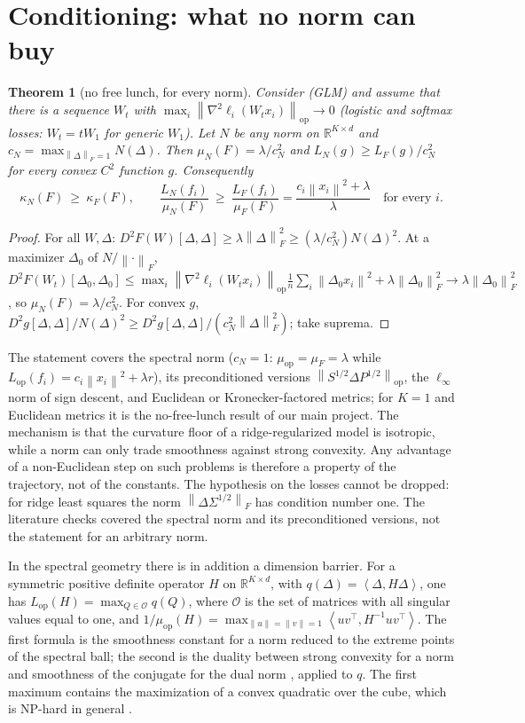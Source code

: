 \documentclass[11pt]{article}
\newtheorem{theorem}{Theorem}
\theoremstyle{remark}
\newcommand{\R}{\mathbb{R}}
\newcommand{\norm}[1]{\left\|#1\right\|}
\newcommand{\nop}[1]{\left\|#1\right\|_{\mathrm{op}}}
\newcommand{\nF}[1]{\left\|#1\right\|_{F}}
\newcommand{\inner}[2]{\left\langle #1, #2 \right\rangle}
\newcommand{\Lop}{L_{\mathrm{op}}}
\newcommand{\muop}{\mu_{\mathrm{op}}}
\newcommand{\kF}{\kappa_{F}}
\newcommand{\cO}{\mathcal{O}}
\begin{document}
\section{Conditioning: what no norm can buy}\label{sec:kappa}

\begin{theorem}[no free lunch, for every norm]\label{thm:nfl}
Consider (GLM) and assume that there is a sequence $W_t$ with $\max_i\nop{\nabla^2\ell_i(W_tx_i)}\to0$ (logistic and
softmax losses: $W_t=tW_1$ for generic $W_1$). Let $N$ be any norm on $\R^{K\times d}$ and $c_N=\max_{\nF\Delta=1}N(\Delta)$.
Then $\mu_N(F)=\lambda/c_N^2$ and $L_N(g)\ge L_F(g)/c_N^2$ for every convex $C^2$ function $g$. Consequently
\[
\kappa_N(F)\ \ge\ \kF(F),\qquad \frac{L_N(f_i)}{\mu_N(F)}\ \ge\ \frac{L_F(f_i)}{\mu_F(F)}=\frac{c_i\norm{x_i}^2+\lambda}{\lambda}\quad\text{for every }i .
\]
\end{theorem}
\begin{proof}
For all $W,\Delta$: $D^2F(W)[\Delta,\Delta]\ge\lambda\nF\Delta^2\ge(\lambda/c_N^2)N(\Delta)^2$. At a maximizer $\Delta_0$
of $N/\nF\cdot$, $D^2F(W_t)[\Delta_0,\Delta_0]\le\max_i\nop{\nabla^2\ell_i(W_tx_i)}\frac1n\sum_i\norm{\Delta_0x_i}^2+\lambda\nF{\Delta_0}^2
\to\lambda\nF{\Delta_0}^2$, so $\mu_N(F)=\lambda/c_N^2$. For convex $g$,
$D^2g[\Delta,\Delta]/N(\Delta)^2\ge D^2g[\Delta,\Delta]/(c_N^2\nF\Delta^2)$; take suprema.
\end{proof}

The statement covers the spectral norm ($c_N=1$: $\muop=\mu_F=\lambda$ while $\Lop(f_i)=c_i\norm{x_i}^2+\lambda r$), its
preconditioned versions $\nop{S^{1/2}\Delta P^{1/2}}$, the $\ell_\infty$ norm of sign descent, and Euclidean or
Kronecker-factored metrics; for $K=1$ and Euclidean metrics it is the no-free-lunch result of our main project. The
mechanism is that the curvature floor of a ridge-regularized model is isotropic, while a norm can only trade smoothness
against strong convexity. Any advantage of a non-Euclidean step on such problems is therefore a property of the
trajectory, not of the constants. The hypothesis on the losses cannot be dropped: for ridge least squares the norm
$\nF{\Delta\Sigma^{1/2}}$ has condition number one. The literature checks covered the spectral norm and its
preconditioned versions, not the statement for an arbitrary norm.

In the spectral geometry there is in addition a dimension barrier. For a symmetric positive definite operator $H$ on
$\R^{K\times d}$, with $q(\Delta)=\inner\Delta{H\Delta}$, one has $\Lop(H)=\max_{Q\in\cO}q(Q)$, where $\cO$ is the set of
matrices with all singular values equal to one, and $1/\muop(H)=\max_{\norm u=\norm v=1}\inner{uv^\top}{H^{-1}uv^\top}$.
The first formula is the smoothness constant for a norm \cite{balles2020geometry,islamov2026noneuclidean} reduced to the
extreme points of the spectral ball; the second is the duality between strong convexity for a norm and smoothness of
the conjugate for the dual norm \cite{kakade2012regularization}, applied to $q$. The first maximum contains the
maximization of a convex quadratic over the cube, which is NP-hard in general
\cite{islamov2026noneuclidean,balles2020geometry}.
\end{document}
